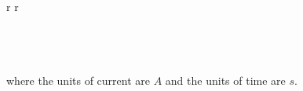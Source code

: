 \documentclass[aspectratio=169]{beamer}
\begin{document}
\begin{frame}[fragile]
\begin{tabular}{r r}
\begin{columns}
	
	
	
	\end{columns}\\
	
	

 \begin{columns}
	    		  \begin{column}{1\textwidth}  %
 \newline \newline where the units of current are $A$ and the units of time are $s$.
		      		\end{column}

	  \end{columns}\\
	
\end{tabular}
\end{frame}
	
\end{document}

